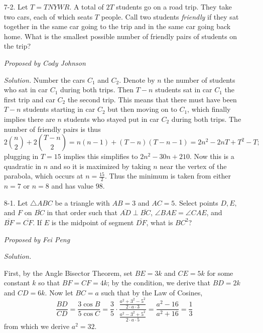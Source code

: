 \documentclass[10pt]{article}
\newcommand{\proposed}[1]
{
\vspace{5pt}
\noindent\textit{Proposed by #1}
}
\newcommand{\solution}
{
\vspace{5pt}
\noindent\textit{Solution.}\qquad
}
\begin{document}
\begin{enumerate}
\proposed{Patrick Lin}

\solution
The most straightforward solution is simply to use coordinates. We have $C = (1,0)$, $F = (\tfrac23, 1)$, and can compute $G$ to be $(\tfrac{2}{11},\tfrac{3}{11})$ by intersecting lines $x + 3y = 1$ and $3x = 2y$. Using the shoelace theorem yields an area of $\tfrac{4}{11}$, so the answer is $\boxed{15}$.


\item[7-2.] Let $T = TNYWR$. A total of $2T$ students go on a road trip. They take two cars, each of which seats $T$ people. Call two students \textit{friendly} if they sat together in the same car going to the trip and in the same car going back home. What is the smallest possible number of friendly pairs of students on the trip?

\proposed{Cody Johnson}

\solution Number the cars $C_1$ and $C_2$.  Denote by $n$ the number of students who sat in car $C_1$ during both trips.  Then $T - n$ students sat in car $C_1$ the first trip and car $C_2$ the second trip.  This means that there must have been $T - n$ students starting in car $C_2$ but then moving on to $C_1$, which finally implies there are $n$ students who stayed put in car $C_2$ during both trips.  The number of friendly pairs is thus \[2\binom n2 + 2\binom{T-n}2 = n(n-1) + (T-n)(T-n-1) = 2n^2 - 2nT + T^2 - T;\] plugging in $T = 15$ implies this simplifies to $2n^2 - 30n + 210$.  Now this is a quadratic in $n$ and so it is maximized by taking $n$ near the vertex of the parabola, which occurs at $n=\tfrac{15}2$.  Thus the minimum is taken from either $n=7$ or $n=8$ and has value $\boxed{98}$.

\item[8-1.] Let $\triangle ABC$ be a triangle with $AB=3$ and $AC=5$. Select points $D, E,$ and $F$ on $\overline{BC}$ in that order such that $\overline{AD}\perp \overline{BC}$, $\angle BAE=\angle CAE$, and $\overline{BF}=\overline{CF}$. If $E$ is the midpoint of segment $\overline{DF}$, what is $BC^2$?

\proposed{Fei Peng}

\solution
First, by the Angle Bisector Theorem, set $BE=3k$ and $CE=5k$ for some constant $k$ so that $BF=CF=4k$; by the condition, we derive that $BD=2k$ and $CD=6k$. Now let $BC=a$ such that by the Law of Cosines, $$\frac{BD}{CD}=\frac{3\cos B}{5\cos C}=\frac{3}{5}\cdot \frac{\frac{a^2+3^2-5^2}{2\cdot a\cdot 3}}{\frac{a^2-3^2+5^2}{2\cdot a\cdot 5}}=\frac{a^2-16}{a^2+16}=\frac{1}{3}$$ from which we derive $a^2=\boxed{32}$. 



\end{enumerate}
\end{document}
